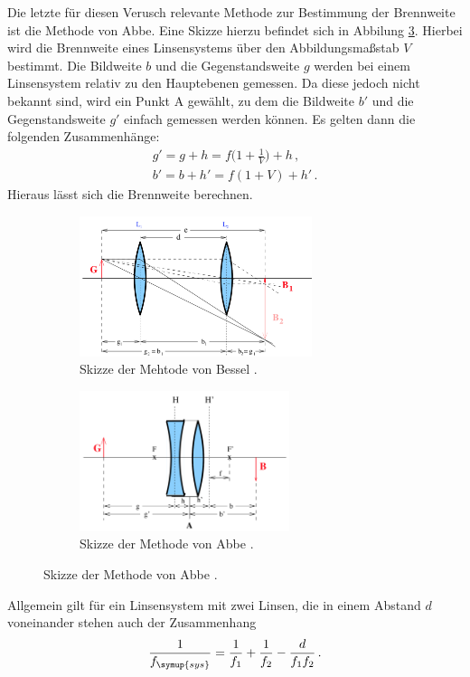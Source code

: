 Die letzte für diesen Verusch relevante Methode zur Bestimmung der Brennweite ist
die Methode von Abbe. Eine Skizze hierzu befindet sich in Abbilung \ref{fig:abbe}.
Hierbei wird die Brennweite eines Linsensystems über den Abbildungsmaßstab $V$ bestimmt.
Die Bildweite $b$ und die Gegenstandsweite $g$ werden bei einem Linsensystem relativ zu den
Hauptebenen gemessen. Da diese jedoch nicht bekannt sind, wird ein Punkt A gewählt, zu dem
die Bildweite $b'$ und die Gegenstandsweite $g'$ einfach gemessen werden können. Es
gelten dann die folgenden Zusammenhänge:
\begin{align}
  g'=g+h=f\biggl(1+\frac{1}{V}\biggr)+h \,,\\
  b'=b+h'=f(1+V)+h'\,.
\end{align}
Hieraus lässt sich die Brennweite berechnen.

\begin{figure}
  \centering
  \begin{subfigure}{0.48\textwidth}
    \includegraphics[height=4.1cm]{data/bessel.png}
    \caption{Skizze der Mehtode von Bessel \cite{Versuchsanleitung}.}
    \label{fig:bessel}
  \end{subfigure}
  \begin{subfigure}{0.48\textwidth}
    \centering
    \includegraphics[height=4.1cm]{data/abbe.png}
    \caption{Skizze der Methode von Abbe \cite{Versuchsanleitung}.}
    \label{fig:abbe}
  \end{subfigure}
\end{figure}

Allgemein gilt für ein Linsensystem mit zwei Linsen, die in einem Abstand $d$
voneinander stehen auch der Zusammenhang
\begin{equation}
  \frac{1}{f_{\symup{sys}}}=\frac{1}{f_1}+\frac{1}{f_2}-\frac{d}{f_1 f_2} \,.
  \label{eqn:system}
\end{equation}
